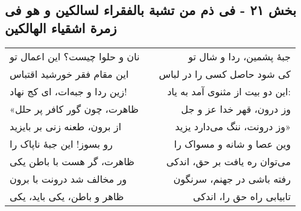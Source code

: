 \begin{center}
\section*{بخش ۲۱ - فی ذم من تشبة بالفقراء لسالکین و هو فی زمرة اشقیاء الهالکین}
\label{sec:021}
\begin{longtable}{l p{0.5cm} r}
نان و حلوا چیست؟ این اعمال تو
&&
جبهٔ پشمین، ردا و شال تو
\\
این مقام فقر خورشید اقتباس
&&
کی شود حاصل کسی را در لباس
\\
زین ردا و جبه‌ات، ای کج نهاد!
&&
این دو بیت از مثنوی آمد به یاد:
\\
«ظاهرت، چون گور کافر پر حلل
&&
وز درون، قهر خدا عز و جل
\\
از برون، طعنه زنی بر بایزید
&&
وز درونت، ننگ می‌دارد یزید»
\\
رو بسوز! این جبهٔ ناپاک را
&&
وین عصا و شانه و مسواک را
\\
ظاهرت، گر هست با باطن یکی
&&
می‌توان ره یافت بر حق، اندکی
\\
ور مخالف شد درونت با برون
&&
رفته باشی در جهنم، سرنگون
\\
ظاهر و باطن، یکی باید، یکی
&&
تابیابی راه حق را، اندکی
\\
\end{longtable}
\end{center}
